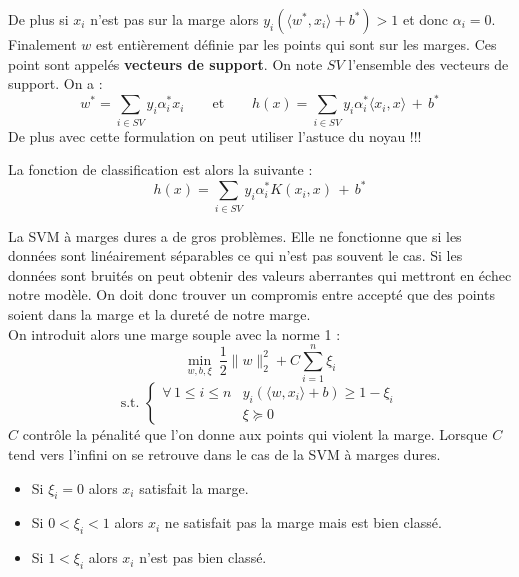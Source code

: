 De plus si $x_i$ n'est pas sur la marge alors $y_i \left( \langle w^*, x_i \rangle + b^* \right) > 1$ et donc $\alpha_i = 0$. Finalement $w$ est entièrement définie par les points qui sont sur les marges. Ces point sont appelés \textbf{vecteurs de support}. On note $SV$ l'ensemble des vecteurs de support. On a :
$$ w^* = \sum_{i \in SV} y_i \alpha_i^* x_i \qquad \text{et} \qquad h(x) = \sum_{i \in SV} y_i \alpha_i^* \langle x_i, x \rangle \, + \, b^*$$
De plus avec cette formulation on peut utiliser l'astuce du noyau !!!
\begin{center}
\end{center}
La fonction de classification est alors la suivante :
$$ h(x) = \sum_{i \in SV} y_i \alpha_i^* K(x_i, x) \, + \, b^* $$


La SVM à marges dures a de gros problèmes. Elle ne fonctionne que si les données sont linéairement séparables ce qui n'est pas souvent le cas. Si les données sont bruités on peut obtenir des valeurs aberrantes qui mettront en échec notre modèle. On doit donc trouver un compromis entre accepté que des points soient dans la marge et la dureté de notre marge. \\

On introduit alors une marge souple avec la norme 1 :
$$ \min_{w, b, \xi}~\dfrac{1}{2} \| w \|_2^2 + C \sum_{i = 1}^n \xi_i $$
\vspace{-4mm}
$$ \text{s.t. } \left\{ \begin{array}{lll}
\forall \, 1 \leqslant i \leqslant n & y_i \left( \langle w, x_i \rangle + b \right) \geqslant 1 - \xi_i \\
 & \xi \succeq 0
\end{array} \right. $$
$C$ contrôle la pénalité que l'on donne aux points qui violent la marge. Lorsque $C$ tend vers l'infini on se retrouve dans le cas de la SVM à marges dures.
\begin{itemize}
	\item Si $\xi_i = 0$ alors $x_i$ satisfait la marge.
	\item Si $0 < \xi_i < 1 $ alors $x_i$ ne satisfait pas la marge mais est bien classé.
	\item Si $1 < \xi_i$ alors $x_i$ n'est pas bien classé.
\end{itemize}

